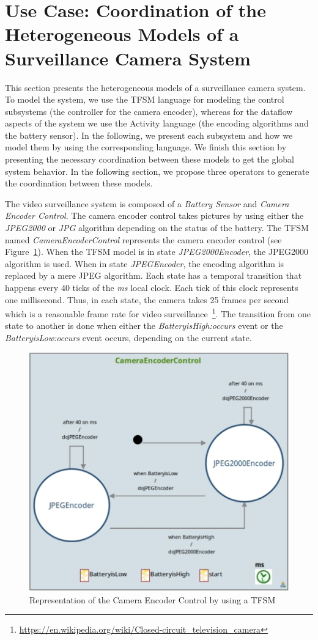 \section{Use Case: Coordination of the Heterogeneous Models of a Surveillance Camera System}
This section presents the heterogeneous models of a surveillance camera system. To model the system, we use the TFSM language for modeling the control subsystems (\ie the controller for the camera encoder), whereas for the dataflow aspects of the system we use the Activity language (\ie the encoding algorithms and the battery sensor). In the following, we present each subsystem and how we model them by using the corresponding language. We finish this section by presenting the necessary coordination between these models to get the global system behavior. In the following section, we propose three operators to generate the coordination between these models. 

The video surveillance system is composed of a \emph{Battery Sensor} and \emph{Camera Encoder Control}. The camera encoder control takes pictures by using either the \emph{JPEG2000} or \emph{JPG} algorithm depending on the status of the battery. The TFSM named \emph{CameraEncoderControl} represents the camera encoder control (see Figure~\ref{fig:cameramodelencoder}). When the TFSM model is in state \emph{JPEG2000Encoder}, the JPEG2000 algorithm is used. When in state \emph{JPEGEncoder}, the encoding algorithm is replaced by a mere JPEG algorithm. Each state has a temporal transition that happens every 40 ticks of the \emph{ms} local clock. Each tick of this clock represents one millisecond. Thus, in each state, the camera takes 25 frames per second which is a reasonable frame rate for video surveillance~\footnote{\url{https://en.wikipedia.org/wiki/Closed-circuit\_television\_camera}}. The transition from one state to another is done when either the \emph{BatteryisHigh:occurs} event or the \emph{BatteryisLow:occurs} event occurs, depending on the current state.	
	
		\begin{figure}[h]
			\center
			\includegraphics[width=.6\columnwidth]{examples/figs/cameraencodercontrol.pdf}
			\caption{Representation of the Camera Encoder Control by using a TFSM}
			\label{fig:cameramodelencoder}
		\end{figure}
		

